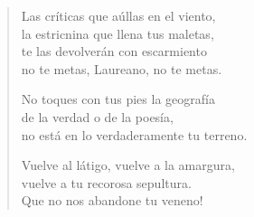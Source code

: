 \documentclass[12pt]{article}
\begin{document}
\begin{verse}
Las críticas que aúllas en el viento,\\
la estricnina que llena tus maletas,\\
te las devolverán con escarmiento\\
no te metas, Laureano, no te metas.  

No toques con tus pies la geografía\\
de la verdad o de la poesía,\\
no está en lo verdaderamente tu terreno.  

Vuelve al látigo, vuelve a la amargura,\\
vuelve a tu recorosa sepultura.\\
Que no nos abandone tu veneno!  
\end{verse}
\end{document}
